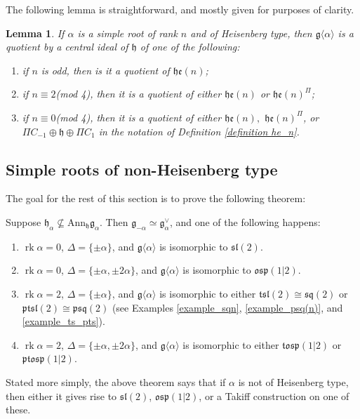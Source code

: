 \documentclass[12pt, a4paper, reqno]{amsart}
\def\e{\mathfrak{e}}
\def\p{\mathfrak{p}}
\def\q{\mathfrak{q}}
\def\g{\mathfrak{g}}
\def\h{\mathfrak{h}}
\def\l{\mathfrak{l}}
\def\s{\mathfrak{s}}
\def\o{\mathfrak{o}}
\def\rk{\operatorname{rk}}
\newtheorem{lemma}{Lemma}
\theoremstyle{definition}
\theoremstyle{definition}
\theoremstyle{definition}
\numberwithin{theorem}{section}
\numberwithin{lemma}{section}
\numberwithin{remark}{section}
\numberwithin{definition}{section}
\numberwithin{corollary}{section}
\numberwithin{proposition}{section}
\numberwithin{example}{section}
\begin{document}
	The following lemma is straightforward, and mostly given for purposes of clarity.
	\begin{lemma}
		If $\alpha$ is a simple root of rank $n$ and of Heisenberg type, then $\g\langle\alpha\rangle$ is a quotient by a central ideal of $\h$ of one of the following:
		\begin{enumerate}
			\item if $n$ is odd, then is it a quotient of $\h\e(n)$;
			\item if $n\equiv 2$(mod 4), then it is a quotient of either $\h\e(n)$ or $\h\e(n)^{\Pi}$;
			\item if $n\equiv 0$(mod 4), then it is a quotient of either $\h\e(n),$ $\h\e(n)^{\Pi}$, or $\Pi C_{-1}\oplus \h\oplus\Pi C_1$ in the notation of Definition \ref{definition he_n}.
		\end{enumerate} 
	\end{lemma}
	
	
	\subsection{Simple roots of non-Heisenberg type}   The goal for the rest of this section is to prove the following theorem:
	
	\begin{theorem}\label{theorem-one-simple-root}
		Suppose \(\h_{\alpha} \nsubseteq \mathrm{Ann}_{\mathfrak{h}}\mathfrak{g}_{\alpha}\). Then \(\mathfrak{g}_{-\alpha} \simeq \mathfrak{g}_{\alpha}^\vee\), and one of the following happens:
		\begin{enumerate}[label=(\roman*)]
			\item \(\rk\alpha = 0\), \(\Delta = \{\pm \alpha\}\), and \(\mathfrak{g}\langle \alpha \rangle\) is isomorphic to \(\s\l(2)\).
			\item \(\rk\alpha = 0\), \(\Delta = \{\pm \alpha,\pm 2\alpha\}\), and \(\mathfrak{g}\langle \alpha \rangle\) is isomorphic to \(\mathfrak{osp}(1|2)\).
			\item \(\rk\alpha = 2\), \(\Delta = \{\pm \alpha\}\), and \(\mathfrak{g}\langle \alpha \rangle\) is isomorphic to either $\mathfrak{tsl}(2)\cong\s\q(2)$ or $\mathfrak{ptsl}(2)\cong\p\s\q(2)$ (see Examples \ref{example_sqn}, \ref{example_psq(n)}, and \ref{example_ts_pts}).
			\item \(\rk\alpha = 2\), \(\Delta = \{\pm \alpha,\pm 2\alpha\}\), and \(\mathfrak{g}\langle \alpha \rangle\) is isomorphic to either $\mathfrak{t}\o\s\p(1|2)$ or $\p\mathfrak{t}\o\s\p(1|2)$.
		\end{enumerate}
	\end{theorem}
	Stated more simply, the above theorem says that if $\alpha$ is not of Heisenberg type, then either it gives rise to $\s\l(2)$, $\o\s\p(1|2)$, or a Takiff construction on one of these.
	
\end{document}
